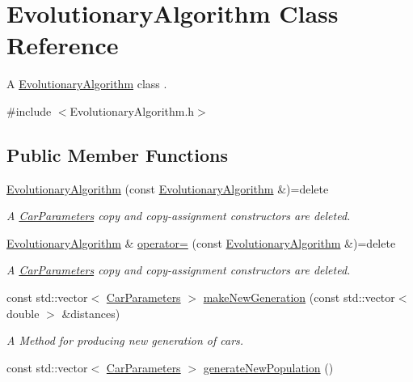 \hypertarget{classEvolutionaryAlgorithm}{}\section{Evolutionary\+Algorithm Class Reference}
\label{classEvolutionaryAlgorithm}


A \hyperlink{classEvolutionaryAlgorithm}{Evolutionary\+Algorithm} class .  




{\ttfamily \#include $<$Evolutionary\+Algorithm.\+h$>$}

\subsection*{Public Member Functions}
\begin{DoxyCompactItemize}
\item 
\hyperlink{classEvolutionaryAlgorithm_ae93cddd09649e8077b553c09919542b4}{Evolutionary\+Algorithm} (const \hyperlink{classEvolutionaryAlgorithm}{Evolutionary\+Algorithm} \&)=delete
\begin{DoxyCompactList}\small\item\em A \hyperlink{classCarParameters}{Car\+Parameters} copy and copy-\/assignment constructors are deleted. \end{DoxyCompactList}\item 
\hyperlink{classEvolutionaryAlgorithm}{Evolutionary\+Algorithm} \& \hyperlink{classEvolutionaryAlgorithm_a4726d79d2cfc00b01f521a2fb8b87863}{operator=} (const \hyperlink{classEvolutionaryAlgorithm}{Evolutionary\+Algorithm} \&)=delete
\begin{DoxyCompactList}\small\item\em A \hyperlink{classCarParameters}{Car\+Parameters} copy and copy-\/assignment constructors are deleted. \end{DoxyCompactList}\item 
const std\+::vector$<$ \hyperlink{classCarParameters}{Car\+Parameters} $>$ \hyperlink{classEvolutionaryAlgorithm_aa4dc48e8ad0d0e5892546ce6978f492f}{make\+New\+Generation} (const std\+::vector$<$ double $>$ \&distances)
\begin{DoxyCompactList}\small\item\em A Method for producing new generation of cars. \end{DoxyCompactList}\item 
const std\+::vector$<$ \hyperlink{classCarParameters}{Car\+Parameters} $>$ \hyperlink{classEvolutionaryAlgorithm_aad3e66c5d020fdcf1cb1e5ade0f01385}{generate\+New\+Population} ()

\end{DoxyCompactItemize}
